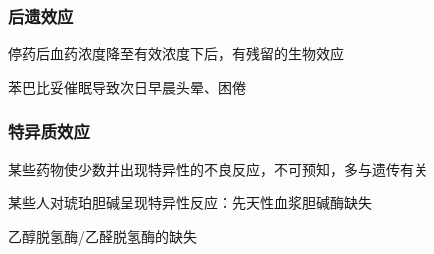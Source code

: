 \subsubsection*{后遗效应}%
\label{subsub:后遗效应}
\begin{defi}
    停药后血药浓度降至有效浓度下后，有残留的生物效应
\end{defi}
\begin{eg}
    苯巴比妥催眠导致次日早晨头晕、困倦
\end{eg}
\subsubsection*{特异质效应}%
\label{subsub:特异质效应}
某些药物使少数并出现特异性的不良反应，不可预知，多与遗传有关
\begin{eg}
    某些人对琥珀胆碱呈现特异性反应：先天性血浆胆碱酶缺失
\end{eg}
\begin{eg}
    乙醇脱氢酶/乙醛脱氢酶的缺失
\end{eg}





